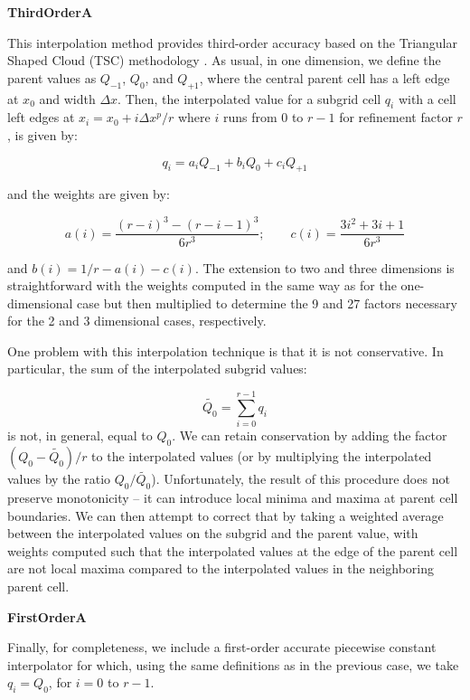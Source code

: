 
\vspace{0.3cm}\noindent
{\bf ThirdOrderA} 

This interpolation method provides third-order accuracy based on the
Triangular Shaped Cloud (TSC) methodology \citep{Hockney88}.  As
usual, in one dimension, we define the parent values as $Q_{-1}$,
$Q_0$, and $Q_{+1}$, where the central parent cell has a left edge at
$x_0$ and width $\Delta x$.  Then, the interpolated value for a
subgrid cell $q_i$ with a cell left edges at $x_i = x_0 + i \Delta
x^p/r$ where $i$ runs from 0 to $r-1$ for refinement factor $r$, is
given by:

\begin{equation}
q_i = a_i  Q_{-1} + b_i Q_0 + c_i Q_{+1}
\end{equation}

and the weights are given by:

\begin{equation}
a(i) =  \frac{(r-i)^3 - (r-i-1)^3}{6r^3}; \qquad c(i) = \frac{3i^2 + 3i + 1}{6r^3}
\end{equation}

and $b(i) = 1/r - a(i) - c(i)$.  The extension to two and three
dimensions is straightforward with the weights computed in the same
way as for the one-dimensional case but then multiplied to determine
the 9 and 27 factors necessary for the 2 and 3 dimensional cases,
respectively.

One problem with this interpolation technique is that it is not
conservative.  In particular, the sum of the interpolated subgrid
values:

\begin{equation}
\tilde{Q_0} = \sum_{i=0}^{r-1} q_i
\end{equation}
is not, in general, equal to $Q_0$.  We can retain conservation by
adding the factor $(Q_0 - \tilde{Q_0})/r$ to the interpolated values
(or by multiplying the interpolated values by the ratio
$Q_0/\tilde{Q_0}$).  Unfortunately, the result of this procedure does
not preserve monotonicity -- it can introduce local minima and maxima
at parent cell boundaries.  We can then attempt to correct that by
taking a weighted average between the interpolated values on the
subgrid and the parent value, with weights computed such that the
interpolated values at the edge of the parent cell are not local
maxima compared to the interpolated values in the neighboring parent
cell.



\vspace{0.3cm}\noindent
{\bf FirstOrderA}

Finally, for completeness, we include a first-order accurate piecewise
constant interpolator for which, using the same definitions as in the
previous case, we take $q_i = Q_0$, for $i = 0$ to $r-1$. 

\vspace{1cm}
